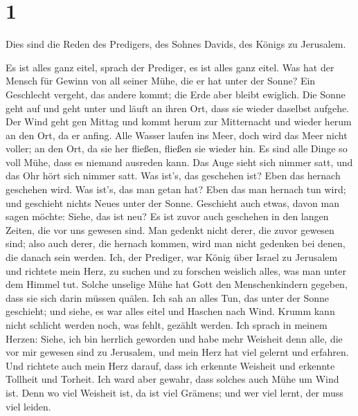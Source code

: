 \hypertarget{section}{%
\section{1}\label{section}}

 Dies sind die Reden des Predigers, des Sohnes Davids, des
Königs zu Jerusalem.

 Es ist alles ganz eitel, sprach der Prediger, es ist
alles ganz eitel.  Was hat der Mensch für Gewinn von all
seiner Mühe, die er hat unter der Sonne?  Ein Geschlecht
vergeht, das andere kommt; die Erde aber bleibt ewiglich. 
Die Sonne geht auf und geht unter und läuft an ihren Ort, dass sie
wieder daselbst aufgehe.  Der Wind geht gen Mittag und
kommt herum zur Mitternacht und wieder herum an den Ort, da er anfing.
 Alle Wasser laufen ins Meer, doch wird das Meer nicht
voller; an den Ort, da sie her fließen, fließen sie wieder hin.
 Es sind alle Dinge so voll Mühe, dass es niemand ausreden
kann. Das Auge sieht sich nimmer satt, und das Ohr hört sich nimmer
satt.  Was ist's, das geschehen ist? Eben das hernach
geschehen wird. Was ist's, das man getan hat? Eben das man hernach tun
wird; und geschieht nichts Neues unter der Sonne. 
Geschieht auch etwas, davon man sagen möchte: Siehe, das ist neu? Es ist
zuvor auch geschehen in den langen Zeiten, die vor uns gewesen sind.
 Man gedenkt nicht derer, die zuvor gewesen sind; also
auch derer, die hernach kommen, wird man nicht gedenken bei denen, die
danach sein werden.  Ich, der Prediger, war König über
Israel zu Jerusalem  und richtete mein Herz, zu suchen
und zu forschen weislich alles, was man unter dem Himmel tut. Solche
unselige Mühe hat Gott den Menschenkindern gegeben, dass sie sich darin
müssen quälen.  Ich sah an alles Tun, das unter der Sonne
geschieht; und siehe, es war alles eitel und Haschen nach Wind.
 Krumm kann nicht schlicht werden noch, was fehlt,
gezählt werden.  Ich sprach in meinem Herzen: Siehe, ich
bin herrlich geworden und habe mehr Weisheit denn alle, die vor mir
gewesen sind zu Jerusalem, und mein Herz hat viel gelernt und erfahren.
 Und richtete auch mein Herz darauf, dass ich erkennte
Weisheit und erkennte Tollheit und Torheit. Ich ward aber gewahr, dass
solches auch Mühe um Wind ist.  Denn wo viel Weisheit
ist, da ist viel Grämens; und wer viel lernt, der muss viel leiden.

